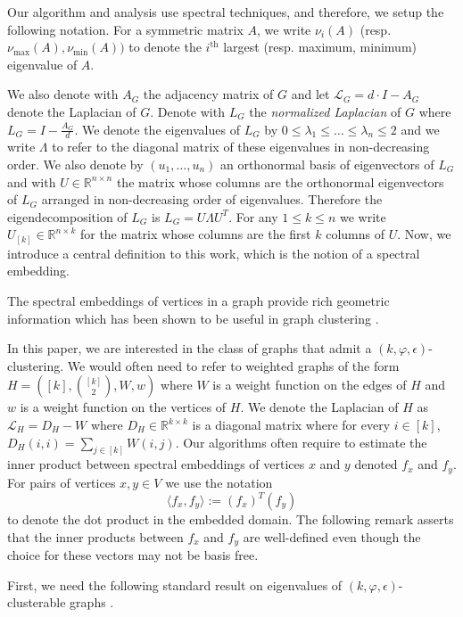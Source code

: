 \documentclass[letterpaper,11pt]{article}
\newcommand{\cL}{\mathcal{L}}
\newcommand{\R}{\mathbb{R}}
\theoremstyle{plain}
\theoremstyle{definition}
\theoremstyle{remark}
\newcommand{\e}{\epsilon}
\begin{document}
Our algorithm and analysis use spectral techniques, and therefore, we setup the following notation. For a symmetric matrix $A$, we write $\nu_i(A)$ (resp. $\nu_{\max}(A), \nu_{\min}(A))$ to denote the $i^{\text{th}}$ largest (resp. maximum, minimum) eigenvalue of $A$. 



We also denote with $A_G$ the adjacency matrix of $G$ and let $\cL_G = d \cdot I - A_G$ denote
the Laplacian of $G$. Denote with $L_G$ the \textit{normalized Laplacian} 
of $G$ where $L_G=I-\frac{A_G}{d}$. We denote the eigenvalues of $L_G$ by  
$0 \leq \lambda_1 \leq \ldots \leq \lambda_n \leq 2$ and we write $\Lambda$ to refer to the 
diagonal matrix of these eigenvalues in non-decreasing order. We also denote by 
$(u_1,\ldots,u_n)$  an orthonormal basis of eigenvectors of $L_G$ and with $U \in \R^{n\times n}$  
the matrix whose columns are the orthonormal eigenvectors of $L_G$ arranged in non-decreasing order 
of eigenvalues. Therefore the eigendecomposition of $L_G$ is $L_G=U \Lambda U^T$. For any 
$1\leq k \leq n$ we write $U_{[k]}\in \R^{n\times k}$ for the matrix whose columns are the first $k$ 
columns of $U$. Now, we introduce a central definition to this work, which is the notion of a spectral embedding. 


The spectral embeddings of vertices in a graph provide rich geometric information which has been
shown to be useful in graph clustering \cite{lee2014multiway, CzumajPS15, chiplunkar2018testing, GluchKLMS21}.

In this paper, we are interested in the class of graphs that admit a $(k, \varphi, \e)$-clustering.
We would often need to refer to weighted graphs of the form $H = ([k], \binom{[k]}{2}, W, w)$
where $W$ is a weight function on the edges of $H$ and $w$ is a weight function on the vertices
of $H$. We denote the Laplacian of $H$ as $\cL_H = D_H - W$ where $D_H \in \R^{k \times k}$ is a diagonal matrix 
where for every $i \in [k]$, $D_H(i,i) = \sum_{j \in [k]} W(i,j)$.
Our algorithms often require
to estimate the inner product between spectral embeddings of vertices $x$ and $y$ denoted  $f_x$ and $f_y$. For pairs of vertices $x, y\in V$ we use the notation 
$$
\langle f_x, f_y\rangle:=({f_x})^T(f_y)
$$
to denote the dot product in the embedded domain. The following remark asserts that the inner products between $f_x$ and
$f_y$ are well-defined even though the choice for these vectors may not be basis free. 


First, we need the following 
standard result on eigenvalues of $(k, \varphi, \e)$-clusterable graphs \cite{lee2014multiway, chiplunkar2018testing}.
\end{document}
